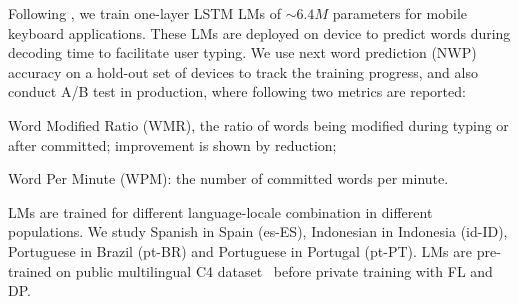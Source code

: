 Following \citet{hard2018gboard,xu2023federated}, we train one-layer LSTM LMs of $\sim6.4M$ parameters for mobile keyboard applications. These LMs are deployed on device to predict words during decoding time to facilitate user typing. 
We use next word prediction (NWP) accuracy on a hold-out set of devices to track the training progress, and also conduct A/B test in production, where following two metrics are reported:
\begin{enumerate*}[label=\color{purple}(\arabic*)]
    \item Word Modified Ratio (WMR), the ratio of words being modified during typing or after committed; improvement is shown by reduction;
    \item Word Per Minute (WPM): the number of committed words per minute.
\end{enumerate*}
LMs are trained for different language-locale combination in different populations. We study Spanish in Spain (es-ES), Indonesian in Indonesia (id-ID), Portuguese in Brazil (pt-BR) and Portuguese in Portugal (pt-PT). LMs are pre-trained on public multilingual C4 dataset~\citep{xue2020mt5} before private training with FL and DP. 

